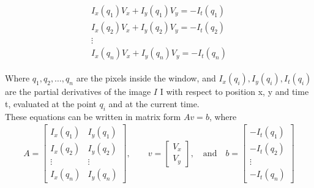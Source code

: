 \begin{align}
\begin{split}
I_{x}(q_{1})V_{x}+I_{y}(q_{1})V_{y}=-I_{t}(q_{1})  \\
I_{x}(q_{2})V_{x}+I_{y}(q_{2})V_{y}=-I_{t}(q_{2})  \\
\vdots \\
I_{x}(q_{n})V_{x}+I_{y}(q_{n})V_{y}=-I_{t}(q_{n}) 
\end{split}
\end{align}

Where $q_{1},q_{2},\dots ,q_{n}$ are the pixels inside the window, and $I_{x}(q_{i}),I_{y}(q_{i}),I_{t}(q_{i})$ are the partial derivatives of the image $I$ I with respect to position x, y and time t, evaluated at the point $q_{i}$ and at the current time.\\
These equations can be written in matrix form $Av=b$, where
\begin{align}
A={\begin{bmatrix}I_{x}(q_{1})&I_{y}(q_{1})\\[10pt]I_{x}(q_{2})&I_{y}(q_{2})\\[10pt]\vdots &\vdots \\[10pt]I_{x}(q_{n})&I_{y}(q_{n})\end{bmatrix}},\quad \quad v={\begin{bmatrix}V_{x}\\[10pt]V_{y}\end{bmatrix}},\quad {\mbox{and}}\quad b={\begin{bmatrix}-I_{t}(q_{1})\\[10pt]-I_{t}(q_{2})\\[10pt]\vdots \\[10pt]-I_{t}(q_{n})\end{bmatrix}}
\end{align}

